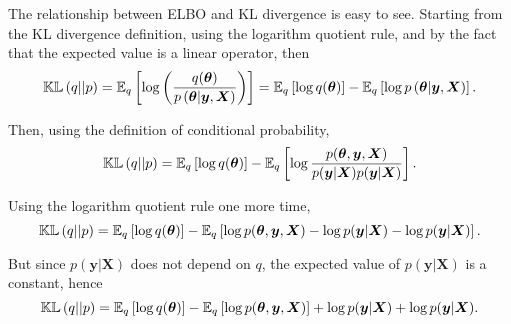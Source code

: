 The relationship between ELBO and KL divergence is easy to see. Starting from the KL divergence definition, using the logarithm quotient rule, and by the fact that the expected value is a linear operator, then
\begin{equation}
    \mathbb{KL}\left( q || p \right) =
    \mathbb{E}_q \left[ \log \left( \frac{q(\boldsymbol{\theta})}{p\left( \boldsymbol{\theta} | \boldsymbol{y}, \boldsymbol{X} \right)} \right) \right] =
    \mathbb{E}_q \left[ \log  q(\boldsymbol{\theta}) \right] - \mathbb{E}_q \left[ \log {p\left( \boldsymbol{\theta} | \boldsymbol{y}, \boldsymbol{X} \right)}  \right].
\end{equation}

Then, using the definition of conditional probability,
\begin{equation}
    \mathbb{KL}\left( q || p \right) =
    \mathbb{E}_q \left[ \log  q(\boldsymbol{\theta}) \right] - \mathbb{E}_q \left[ \log \frac{p(\boldsymbol{\theta}, \boldsymbol{y}, \boldsymbol{X})}{p(\boldsymbol{y} | \boldsymbol{X}) p(\boldsymbol{y} | \boldsymbol{X})}  \right].
\end{equation}

Using the logarithm quotient rule one more time,
\begin{equation}
  \mathbb{KL}\left( q || p \right) =
  \mathbb{E}_q \left[ \log  q(\boldsymbol{\theta}) \right] - \mathbb{E}_q \left[ \log p(\boldsymbol{\theta}, \boldsymbol{y}, \boldsymbol{X}) - \log p(\boldsymbol{y} | \boldsymbol{X}) - \log p(\boldsymbol{y} | \boldsymbol{X})  \right].
\end{equation}

But since $p(\boldsymbol{y} | \boldsymbol{X})$ does not depend on $q$, the expected value of $p(\boldsymbol{y} | \boldsymbol{X})$ is a constant, hence
\begin{equation}
 \mathbb{KL}\left( q || p \right) =
 \mathbb{E}_q \left[ \log  q(\boldsymbol{\theta}) \right] - \mathbb{E}_q \left[ \log p(\boldsymbol{\theta}, \boldsymbol{y}, \boldsymbol{X}) \right] + \log p(\boldsymbol{y} | \boldsymbol{X}) + \log p(\boldsymbol{y} | \boldsymbol{X}).
\end{equation}

